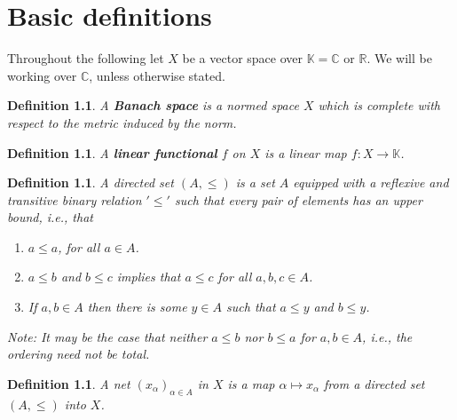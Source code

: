 \documentclass[10pt,twoside,openany,final]{memoir}
\theoremstyle{break}
\newtheorem{definition}[section]{Definition}
\theoremstyle{Break}
\newcommand{\R}{\mathbb{R}}
\newcommand{\C}{\mathbb{C}}
\begin{document}
\chapter{Basic definitions}
Throughout the following let $X$ be a vector space over $\mathbb{K}= \C$ or $\R$. We will be working over $\C$, unless otherwise stated.
\begin{definition}
A \textbf{Banach space} is a normed space $X$ which is complete with respect to the metric induced by the norm.
\end{definition}
\begin{definition}
A \textbf{linear functional} $f$ on $X$ is a linear map $f\colon X \to \mathbb{K}$.
\end{definition}
\begin{definition} 
A \emph{directed set} $(A,\leq)$ is a set $A$ equipped with a reflexive and transitive binary relation $'\leq'$ such that every pair of elements has an upper bound, i.e., that
\begin{enumerate}
\item $a \leq a$, for all $a \in A$.
\item $a \leq b$ and $b \leq c$ implies that $a \leq c$ for all $a,b,c \in A$.
\item If $a,b \in A$ then there is some $y \in A$ such that $a\leq y$ and $b \leq y$.
\end{enumerate}
\textit{Note: It may be the case that neither $a\leq b$ nor $b\leq a$ for $a,b \in A$, i.e., the ordering need not be total.}
\end{definition}
\begin{definition}
A \emph{net} $(x_{\alpha})_{\alpha \in A}$ in $X$ is a map $\alpha \mapsto x_{\alpha}$ from a directed set $(A,\leq)$ into $X$.
\end{definition}
\end{document}
